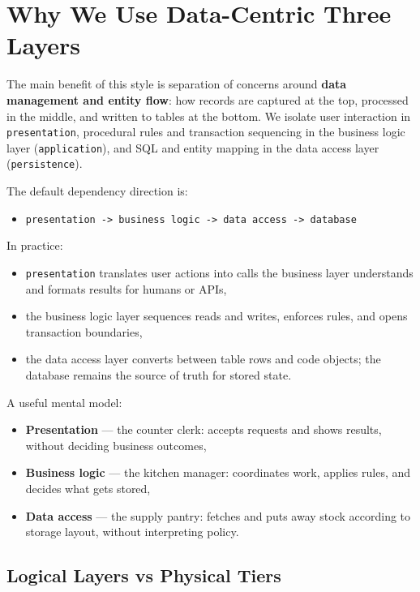 \section{Why We Use Data-Centric Three Layers}
\label{sec:three_layered_why}

The main benefit of this style is separation of concerns around \textbf{data management and entity flow}: how records are captured at the top, processed in the middle, and written to tables at the bottom.\autocite{microsoftThreeTier} We isolate user interaction in \texttt{presentation}, procedural rules and transaction sequencing in the business logic layer (\texttt{application}), and SQL and entity mapping in the data access layer (\texttt{persistence}).

The default dependency direction is:
\begin{itemize}
    \item \texttt{presentation -> business logic -> data access -> database}
\end{itemize}

In practice:
\begin{itemize}
    \item \texttt{presentation} translates user actions into calls the business layer understands and formats results for humans or APIs,
    \item the business logic layer sequences reads and writes, enforces rules, and opens transaction boundaries,
    \item the data access layer converts between table rows and code objects; the database remains the source of truth for stored state.
\end{itemize}

A useful mental model:\autocite{microsoft2003layered}
\begin{itemize}
    \item \textbf{Presentation} --- the counter clerk: accepts requests and shows results, without deciding business outcomes,
    \item \textbf{Business logic} --- the kitchen manager: coordinates work, applies rules, and decides what gets stored,
    \item \textbf{Data access} --- the supply pantry: fetches and puts away stock according to storage layout, without interpreting policy.
\end{itemize}

\subsection{Logical Layers vs Physical Tiers}
\label{sec:three_layered_logical_vs_physical}

